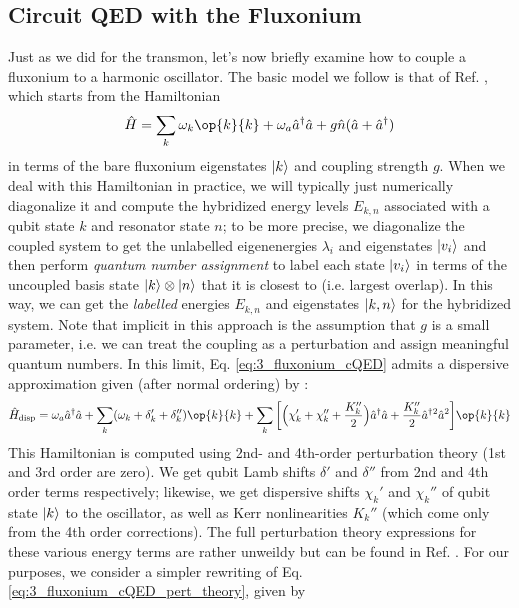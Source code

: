 \subsection{Circuit QED with the Fluxonium\label{sec:3_Circuit_QED_with_Fluxonium}}

Just as we did for the transmon, let's now briefly examine how to couple a fluxonium to a harmonic oscillator. The basic model we follow is that of Ref. \cite{zhu2013cQEDfluxonium}, which starts from the Hamiltonian
\begin{equation}
    \hat{H} = \sum_k \omega_k \op{k}{k} + \omega_a \hat{a}^\dagger\hat{a} + g\hat{n}(\hat{a} + \hat{a}^\dagger)
    \label{eq:3_fluxonium_cQED}
\end{equation}
in terms of the bare fluxonium eigenstates $\lvert k\rangle$ and coupling strength $g$. When we deal with this Hamiltonian in practice, we will typically just numerically diagonalize it and compute the hybridized energy levels $E_{k, n}$ associated with a qubit state $k$ and resonator state $n$; to be more precise, we diagonalize the coupled system to get the unlabelled eigenenergies $\lambda_i$ and eigenstates $\lvert v_i\rangle$ and then perform \textit{quantum number assignment} to label each state $\lvert v_i\rangle$ in terms of the uncoupled basis state $\lvert k\rangle\otimes\lvert n\rangle$ that it is closest to (i.e. largest overlap). In this way, we can get the \textit{labelled} energies $E_{k, n}$ and eigenstates $\lvert k, n\rangle$ for the hybridized system. Note that implicit in this approach is the assumption that $g$ is a small parameter, i.e. we can treat the coupling as a perturbation and assign meaningful quantum numbers. In this limit, Eq. \eqref{eq:3_fluxonium_cQED} admits a dispersive approximation given (after normal ordering) by \cite{zhu2013cQEDfluxonium}:
\begin{equation}
    \hat{H}_{\rm disp} = \omega_a \hat{a}^\dagger\hat{a} + \sum_k (\omega_k + \delta_k' + \delta_k'') \op{k}{k} + \sum_k \bigg[\Big(\chi_k' + \chi_k'' + \frac{K_k''}{2}\Big)\hat{a}^\dagger\hat{a} + \frac{K_k''}{2}\hat{a}^\dagger{}^2\hat{a}^2\bigg] \op{k}{k}
    \label{eq:3_fluxonium_cQED_pert_theory}
\end{equation}
This Hamiltonian is computed using 2nd- and 4th-order perturbation theory (1st and 3rd order are zero). We get qubit Lamb shifts $\delta'$ and $\delta''$ from 2nd and 4th order terms respectively; likewise, we get dispersive shifts $\chi_k'$ and $\chi_k''$ of qubit state $\lvert k\rangle$ to the oscillator, as well as Kerr nonlinearities $K_k''$ (which come only from the 4th order corrections). The full perturbation theory expressions for these various energy terms are rather unweildy but can be found in Ref. \cite{zhu2013cQEDfluxonium}. For our purposes, we consider a simpler rewriting of Eq. \eqref{eq:3_fluxonium_cQED_pert_theory}, given by
